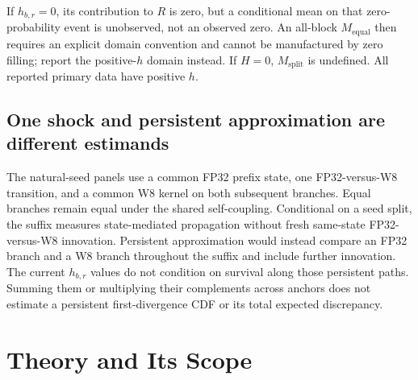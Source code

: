 \documentclass[11pt,a4paper]{article}
\theoremstyle{plain}
\theoremstyle{definition}
\theoremstyle{remark}
\newcommand{\Meq}{M_{\mathrm{equal}}}
\newcommand{\Msplit}{M_{\mathrm{split}}}
\begin{document}
If $h_{b,r}=0$, its contribution to $R$ is zero, but a conditional mean on that
zero-probability event is unobserved, not an observed zero. An all-block
$\Meq$ then requires an explicit domain convention and cannot be manufactured
by zero filling; report the positive-$h$ domain instead. If $H=0$, $\Msplit$
is undefined. All reported primary data have positive $h$.

\subsection{One shock and persistent approximation are different estimands}
\label{sec:estimands}
The natural-seed panels use a common FP32 prefix state, one FP32-versus-W8
transition, and a common W8 kernel on both subsequent branches. Equal branches
remain equal under the shared self-coupling. Conditional on a seed split,
the suffix measures state-mediated propagation without fresh same-state
FP32-versus-W8 innovation. Persistent approximation would instead compare an
FP32 branch and a W8 branch throughout the suffix and include further innovation.
The current $h_{b,r}$ values do not condition on survival along those persistent
paths. Summing them or multiplying their complements across anchors does not
estimate a persistent first-divergence CDF or its total expected discrepancy.

\section{Theory and Its Scope}
\label{sec:theory}
\end{document}
